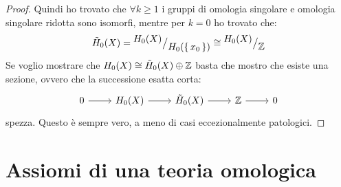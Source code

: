 \begin{proof}
  Quindi ho trovato che $ \forall k \geq 1 $ i gruppi di omologia singolare e omologia singolare ridotta
  sono isomorfi, mentre per $ k = 0 $ ho trovato che:
  \[
    \tilde{H}_0(X) = {^{\textstyle H_0(X)}\big/_{\textstyle H_0(\set{x_0})}} \cong  {^{\textstyle H_0(X)}\big/_{\textstyle \mathbb{Z}}}
  \]
  Se voglio mostrare che $ H_0(X) \cong \tilde{H}_0(X) \oplus \mathbb{Z} $ basta che mostro che esiste una sezione,
  ovvero che la successione esatta corta:
  \[
    \begin{tikzcd}
      0 \rar & H_0(X) \rar & \tilde{H}_0(X) \rar & \Z \rar & 0
    \end{tikzcd}
  \]
  spezza. Questo è sempre vero, a meno di casi eccezionalmente patologici.
\end{proof}


\section{Assiomi di una teoria omologica}

